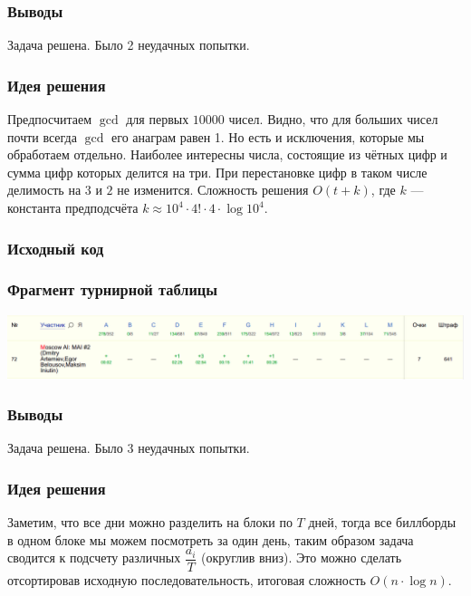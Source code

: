 \subsubsection*{Выводы}
Задача решена. Было 2 неудачных попытки.
\pagebreak


\subsubsection*{Идея решения}
Предпосчитаем $\gcd$ для первых $10000$ чисел. Видно, что для больших чисел почти всегда $\gcd$ его анаграм равен 1. Но есть и исключения, которые мы обработаем отдельно. Наиболее интересны числа, состоящие из чётных цифр и сумма цифр которых делится на три. При перестановке цифр в таком числе делимость на $3$ и $2$ не изменится. Сложность решения $O(t +k)$, где $k$ --- константа предподсчёта $k \approx 10 ^ 4 \cdot 4! \cdot 4 \cdot \log{10 ^ 4}$.
\subsubsection*{Исходный код}

\subsubsection*{Фрагмент турнирной таблицы}
\includegraphics[width=\textwidth]{images/moscow_regional.png}\newline\noindent
\subsubsection*{Выводы}
Задача решена. Было 3 неудачных попытки.
\pagebreak


\subsubsection*{Идея решения}
Заметим, что все дни можно разделить на блоки по $T$ дней, тогда все биллборды в одном блоке мы можем посмотреть за один день, таким образом задача сводится к подсчету различных $\dfrac{a_{i}}{T}$ (округлив вниз). Это можно сделать отсортировав исходную последовательность, итоговая сложность $O(n \cdot \log{n})$.
